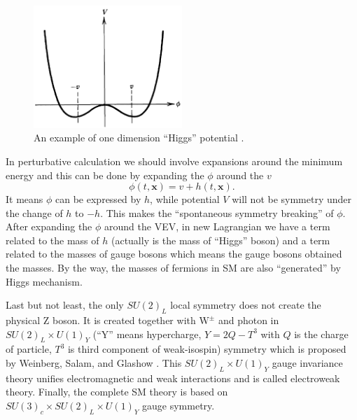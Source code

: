 \begin{figure}[h!]
 \begin{center}
\includegraphics[width=0.5\textwidth]{figures/theory/Higgs_Field.png}
\caption{An example of one dimension ``Higgs'' potential \cite{Quark_Lepton}.}
  \label{fig:Higgs_Potential}
 \end{center}
\end{figure} 

In perturbative calculation we should involve expansions around the minimum energy and this can be done by expanding the $\phi$ around the $v$
$$\phi(t,\mathbf{x})=v+h(t,\mathbf{x}).$$
It means $\phi$ can be expressed by $h$, while potential $V$ will not be symmetry under the change of $h$ to $-h$. This makes the ``spontaneous symmetry breaking'' of $\phi$. After expanding the $\phi$ around the VEV, in new Lagrangian we have a term related to the mass of $h$ (actually is the mass of ``Higgs'' boson) and a term related to the masses of gauge bosons which means the gauge bosons obtained the masses. By the way, the masses of fermions in SM are also ``generated'' by Higgs mechanism.

Last but not least, the only $SU(2)_L$ local symmetry does not create the physical $\mathrm{Z}$ boson. It is created together with $\mathrm{W^{\pm}}$ and photon in $SU(2)_L \times U(1)_Y$ (``Y'' means hypercharge, $Y=2Q-T^{3}$ with $Q$ is the charge of particle, $T^3$ is third component of weak-isospin) symmetry which is proposed by Weinberg, Salam, and Glashow \cite{PhysRevLett.19.1264,Salam1959,GLASHOW1959107}. This $SU(2)_L \times U(1)_Y$ gauge invariance theory unifies electromagnetic and weak interactions and is called electroweak theory. Finally, the complete SM theory is based on $SU(3)_c \times SU(2)_L \times U(1)_Y$ gauge symmetry.



  

